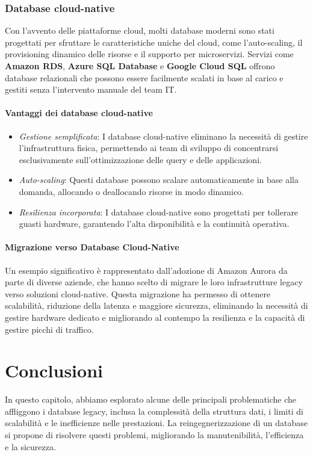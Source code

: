 \subsubsection{Database cloud-native}
Con l'avvento delle piattaforme cloud, molti database moderni sono stati progettati per sfruttare le caratteristiche uniche del cloud, come l'auto-scaling, il provisioning dinamico delle risorse e il supporto per microservizi. Servizi come \textbf{Amazon RDS}, \textbf{Azure SQL Database} e \textbf{Google Cloud SQL} offrono database relazionali che possono essere facilmente scalati in base al carico e gestiti senza l'intervento manuale del team IT.

\paragraph{Vantaggi dei database cloud-native}
\begin{itemize}
    \item \textit{Gestione semplificata}: I database cloud-native eliminano la necessità di gestire l'infrastruttura fisica, permettendo ai team di sviluppo di concentrarsi esclusivamente sull'ottimizzazione delle query e delle applicazioni.
    \item \textit{Auto-scaling}: Questi database possono scalare automaticamente in base alla domanda, allocando o deallocando risorse in modo dinamico.
    \item \textit{Resilienza incorporata}: I database cloud-native sono progettati per tollerare guasti hardware, garantendo l'alta disponibilità e la continuità operativa.
\end{itemize}

\paragraph{Migrazione verso Database Cloud-Native}
Un esempio significativo è rappresentato dall'adozione di Amazon Aurora da parte di diverse aziende, che hanno scelto di migrare le loro infrastrutture legacy verso soluzioni cloud-native. Questa migrazione ha permesso di ottenere scalabilità, riduzione della latenza e maggiore sicurezza, eliminando la necessità di gestire hardware dedicato e migliorando al contempo la resilienza e la capacità di gestire picchi di traffico.


\section*{Conclusioni}
In questo capitolo, abbiamo esplorato alcune delle principali problematiche che affliggono i database legacy, inclusa la complessità della struttura dati, i limiti di scalabilità e le inefficienze nelle prestazioni. La reingegnerizzazione di un database si propone di risolvere questi problemi, migliorando la manutenibilità, l'efficienza e la sicurezza.

